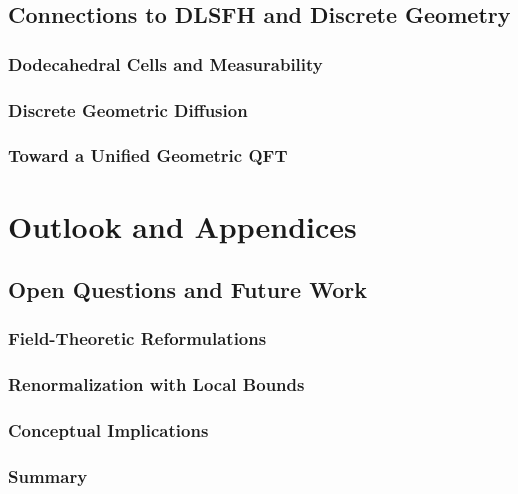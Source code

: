 \documentclass[11pt,oneside]{book}
\numberwithin{equation}{chapter}
\begin{document}
\chapter{Connections to DLSFH and Discrete Geometry}
\section{Dodecahedral Cells and Measurability}
\section{Discrete Geometric Diffusion}
\section{Toward a Unified Geometric QFT}

\part{Outlook and Appendices}

\chapter{Open Questions and Future Work}
\section{Field-Theoretic Reformulations}
\section{Renormalization with Local Bounds}
\section{Conceptual Implications}
\section{Summary}
\end{document}

